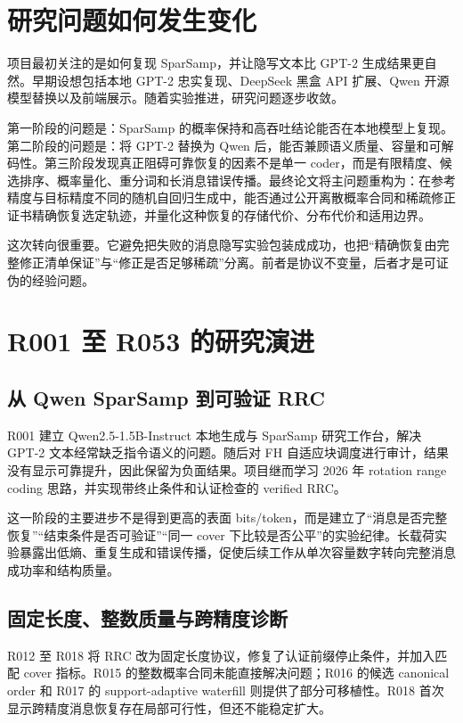 \documentclass[12pt,a4paper]{article}
\begin{document}
\section{研究问题如何发生变化}

项目最初关注的是如何复现 SparSamp，并让隐写文本比 GPT-2 生成结果更自然。早期设想包括本地 GPT-2 忠实复现、DeepSeek 黑盒 API 扩展、Qwen 开源模型替换以及前端展示。随着实验推进，研究问题逐步收敛。

第一阶段的问题是：SparSamp 的概率保持和高吞吐结论能否在本地模型上复现。第二阶段的问题是：将 GPT-2 替换为 Qwen 后，能否兼顾语义质量、容量和可解码性。第三阶段发现真正阻碍可靠恢复的因素不是单一 coder，而是有限精度、候选排序、概率量化、重分词和长消息错误传播。最终论文将主问题重构为：在参考精度与目标精度不同的随机自回归生成中，能否通过公开离散概率合同和稀疏修正证书精确恢复选定轨迹，并量化这种恢复的存储代价、分布代价和适用边界。

这次转向很重要。它避免把失败的消息隐写实验包装成成功，也把“精确恢复由完整修正清单保证”与“修正是否足够稀疏”分离。前者是协议不变量，后者才是可证伪的经验问题。

\section{R001 至 R053 的研究演进}

\subsection{从 Qwen SparSamp 到可验证 RRC}

R001 建立 Qwen2.5-1.5B-Instruct 本地生成与 SparSamp 研究工作台，解决 GPT-2 文本经常缺乏指令语义的问题。随后对 FH 自适应块调度进行审计，结果没有显示可靠提升，因此保留为负面结果。项目继而学习 2026 年 rotation range coding 思路，并实现带终止条件和认证检查的 verified RRC。

这一阶段的主要进步不是得到更高的表面 bits/token，而是建立了“消息是否完整恢复”“结束条件是否可验证”“同一 cover 下比较是否公平”的实验纪律。长载荷实验暴露出低熵、重复生成和错误传播，促使后续工作从单次容量数字转向完整消息成功率和结构质量。

\subsection{固定长度、整数质量与跨精度诊断}

R012 至 R018 将 RRC 改为固定长度协议，修复了认证前缀停止条件，并加入匹配 cover 指标。R015 的整数概率合同未能直接解决问题；R016 的候选 canonical order 和 R017 的 support-adaptive waterfill 则提供了部分可移植性。R018 首次显示跨精度消息恢复存在局部可行性，但还不能稳定扩大。
\end{document}
